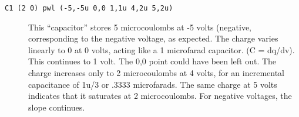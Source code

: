 \begin{description}

\item[{\tt C1 (2 0) pwl (-5,-5u 0,0 1,1u 4,2u 5,2u)}]
This ``capacitor'' stores 5 microcoulombs at -5 volts (negative,
corresponding to the negative voltage, as expected.  The charge varies
linearly to 0 at 0 volts, acting like a 1 microfarad capacitor.  (C =
dq/dv).  This continues to 1 volt.  The 0,0 point could have been left
out.  The charge increases only to 2 microcoulombs at 4 volts, for an
incremental capacitance of 1u/3 or .3333 microfarads.  The same charge
at 5 volts indicates that it saturates at 2 microcoulombs.  For
negative voltages, the slope continues.

\end{description}
